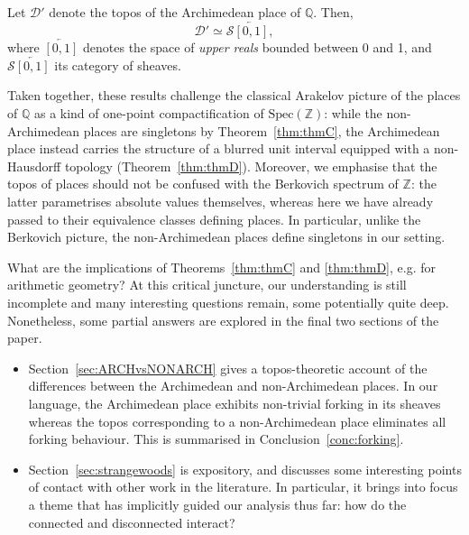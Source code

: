 \documentclass[a4paper, 11pt,reqno]{amsart}
\newcommand{\Spec}{\mathrm{Spec}}
\newcommand{\baseS}{\mathcal{S}}
\newcommand{\D}{\mathcal{D}}
\newcommand{\Z}{\mathbb{Z}}
\newcommand{\Q}{\mathbb{Q}}
\begin{document}
\begin{maintheorem} \label{thm:thmD} Let $\D'$ denote the topos of the Archimedean place of $\Q$. Then,
	 $$\D'\simeq\baseS\overleftarrow{[0,1]},$$
where $\overleftarrow{[0,1]}$ denotes the space of {\em upper reals} bounded between 0 and 1, and $\baseS\overleftarrow{[0,1]}$ its category of sheaves.
\end{maintheorem}

Taken together, these results challenge the classical Arakelov picture of the places of $\Q$ as a kind of one-point compactification of $\Spec(\Z)$:  while the non-Archimedean places are singletons by Theorem~\ref{thm:thmC}, the Archimedean place instead carries the structure of a blurred unit interval equipped with a non-Hausdorff topology (Theorem~\ref{thm:thmD}). Moreover, we emphasise that the topos of places should not be confused with the Berkovich spectrum of $\Z$: the latter parametrises absolute values themselves, whereas here we have already passed to their equivalence classes defining places. In particular, unlike the Berkovich picture, the non-Archimedean places define singletons in our setting.


What are the implications of Theorems~\ref{thm:thmC} and \ref{thm:thmD}, e.g. for arithmetic geometry? At this critical juncture, our understanding is still incomplete and many interesting questions remain, some potentially quite deep. Nonetheless, some partial answers are explored in the final two sections of the paper. 
\begin{itemize}
	\item Section~\ref{sec:ARCHvsNONARCH} gives a topos-theoretic account of the differences between the Archimedean and non-Archimedean places. In our language, the Archimedean place exhibits non-trivial forking in its sheaves whereas the topos corresponding to a non-Archimedean place eliminates all forking behaviour. This is summarised in Conclusion~\ref{conc:forking}.
	\item  Section~\ref{sec:strangewoods} is expository, and discusses some interesting points of contact with other work in the literature. In particular, it brings into focus a theme that has implicitly guided our analysis thus far: how do the connected and disconnected interact? 
	
\end{itemize}
\end{document}
